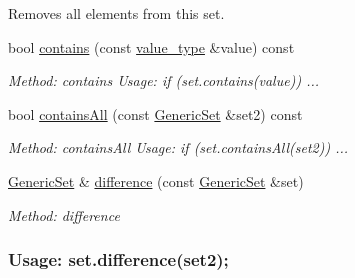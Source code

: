 \begin{DoxyCompactItemize}
\begin{DoxyCompactList}
Removes all elements from this set. \end{DoxyCompactList}\item 
bool \mbox{\hyperlink{classstanfordcpplib_1_1collections_1_1GenericSet_a9b67116c496b2347931664ac27c37921}{contains}} (const \mbox{\hyperlink{classstanfordcpplib_1_1collections_1_1GenericSet_a669c81f158766925e7293f97c0099b28}{value\+\_\+type}} \&value) const
\begin{DoxyCompactList}\small\item\em Method\+: contains Usage\+: if (set.\+contains(value)) ... \end{DoxyCompactList}\item 
bool \mbox{\hyperlink{classstanfordcpplib_1_1collections_1_1GenericSet_abaa27e9ac99d4d889625d3989b40f0b6}{contains\+All}} (const \mbox{\hyperlink{classstanfordcpplib_1_1collections_1_1GenericSet}{Generic\+Set}} \&set2) const
\begin{DoxyCompactList}\small\item\em Method\+: contains\+All Usage\+: if (set.\+contains\+All(set2)) ... \end{DoxyCompactList}\item 
\mbox{\hyperlink{classstanfordcpplib_1_1collections_1_1GenericSet}{Generic\+Set}} \& \mbox{\hyperlink{classstanfordcpplib_1_1collections_1_1GenericSet_af6112917491bf7803154d808ad93518d}{difference}} (const \mbox{\hyperlink{classstanfordcpplib_1_1collections_1_1GenericSet}{Generic\+Set}} \&set)
\begin{DoxyCompactList}\small\item\em Method\+: difference \subsubsection*{Usage\+: set.\+difference(set2); }


\end{DoxyCompactList}
\end{DoxyCompactItemize}
